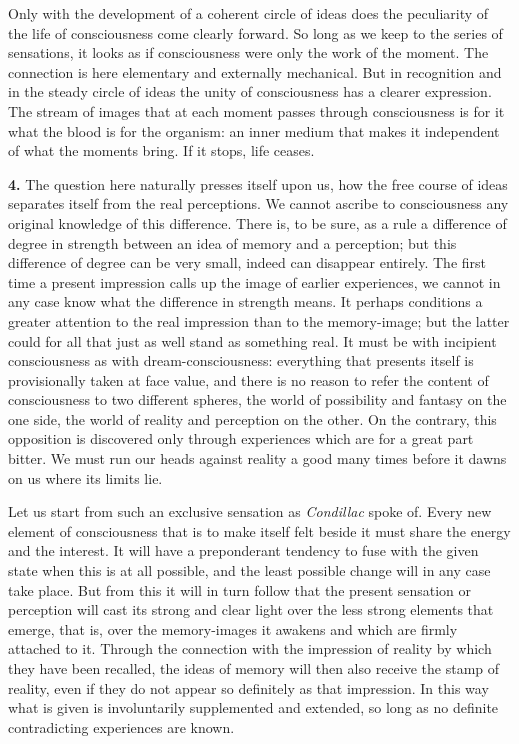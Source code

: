 \documentclass[12pt,a4paper]{book}
\newcommand{\opage}[1]{\marginnote{\footnotesize\textit{[#1]}}}
\begin{document}
Only with the development of a coherent circle of ideas does the
peculiarity of the life of consciousness come clearly forward. So long as
we keep to the series of sensations, it looks as if consciousness were
only the work of the moment. The connection is here elementary and
externally mechanical. But in recognition and in the steady circle of ideas
the unity of consciousness has a clearer expression. The stream of images
that at each moment passes through consciousness is for it what the blood
is for the organism: an inner medium that makes it independent of what the
moments bring. If it stops, life ceases.

\textbf{4.} The question here naturally presses itself upon us, how the
free course of ideas separates itself from the real perceptions. We cannot
ascribe to consciousness any original knowledge of this difference. There
is, to be sure, as a rule a difference of degree in strength between an
idea of memory and a perception; but this difference of degree can be very
small, indeed can disappear entirely. The first time a present impression
calls up the image of earlier experiences, we cannot in any case know what
the difference in strength means. It perhaps conditions a greater
attention to the real impression than
\opage{160}to the memory-image; but the latter could for all that just as
well stand as something real. It must be with incipient consciousness as
with dream-consciousness: everything that presents itself is provisionally
taken at face value, and there is no reason to refer the content of
consciousness to two different spheres, the world of possibility and
fantasy on the one side, the world of reality and perception on the other.
On the contrary, this opposition is discovered only through experiences
which are for a great part bitter. We must run our heads against reality
a good many times before it dawns on us where its limits lie.

Let us start from such an exclusive sensation as \emph{Condillac} spoke
of. Every new element of consciousness that is to make itself felt beside
it must share the energy and the interest. It will have a preponderant
tendency to fuse with the given state when this is at all possible, and
the least possible change will in any case take place. But from this it
will in turn follow that the present sensation or perception will cast its
strong and clear light over the less strong elements that emerge, that is,
over the memory-images it awakens and which are firmly attached to it.
Through the connection with the impression of reality by which they have
been recalled, the ideas of memory will then also receive the stamp of
reality, even if they do not appear so definitely as that impression. In
this way what is given is involuntarily supplemented and extended, so
long as no definite contradicting experiences are known.
\end{document}
